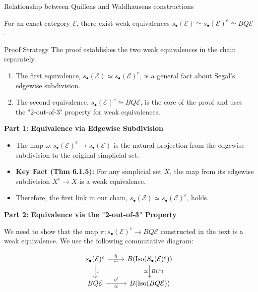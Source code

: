 \documentclass[10pt]{beamer}
\begin{document}
\begin{frame}{Relationship between Quillens and Waldhausens constructions}
		\begin{theorem}
		For an exact category \( \mathcal{E} \), there exist weak equivalences \( s_\bullet(\mathcal{E}) \simeq s_\bullet(\mathcal{E})^e \simeq BQ \mathcal{E}\).
	\end{theorem}
	
	\pagebreak
	\begin{alertblock}{Proof Strategy}
		The proof establishes the two weak equivalences in the chain separately.
		\begin{enumerate}
			\item The first equivalence, $s_\bullet(\mathcal{E}) \simeq s_\bullet(\mathcal{E})^e$, is a general fact about Segal's edgewise subdivision.
			\item The second equivalence, $s_\bullet(\mathcal{E})^e \simeq BQ\mathcal{E}$, is the core of the proof and uses the "2-out-of-3" property for weak equivalences.
		\end{enumerate}
	\end{alertblock}
	
	\pagebreak
	
	\textbf{Part 1: Equivalence via Edgewise Subdivision}
	
	\begin{itemize}
		\item The map $\omega: s_\bullet(\mathcal{E})^e \to s_\bullet(\mathcal{E})$ is the natural projection from the edgewise subdivision to the original simplicial set.
		\item \textbf{Key Fact (Thm 6.1.5):} For any simplicial set $X$, the map from its edgewise subdivision $X^e \to X$ is a weak equivalence.
		\item Therefore, the first link in our chain, $s_\bullet(\mathcal{E}) \simeq s_\bullet(\mathcal{E})^e$, holds.
	\end{itemize}
	
	
	
	\textbf{Part 2: Equivalence via the "2-out-of-3" Property}
	
	We need to show that the map $\pi: s_\bullet(\mathcal{E})^e \to BQ\mathcal{E}$ constructed in the text is a weak equivalence. We use the following commutative diagram:
	
	\[
	\begin{tikzcd}
		s_\bullet(\mathcal{E})^e \arrow{r}{\eta}[swap]{\simeq} \arrow{d}{\pi} & B(\text{Iso}(S_\bullet(\mathcal{E})^e)) \arrow{d}{B(\tilde{\pi})}[swap]{\simeq} \\
		B Q \mathcal{E} \arrow{r}{\eta'}[swap]{\simeq} & B(\text{Iso}(B Q \mathcal{E}))
	\end{tikzcd}
	\]
	

\end{frame}
\end{document}
